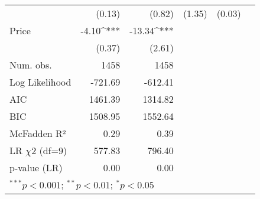 \begin{table}[h]
\begin{center}
\begin{tabular}{l D{.}{.}{4.5} D{.}{.}{4.5} D{.}{.}{2.5} D{.}{.}{2.5} D{.}{.}{3.2}}
                                   & (0.13)      & (0.82)       & (1.35)      & (0.03)     &        \\
Price                              & -4.10^{***} & -13.34^{***} &             &            &        \\
                                   & (0.37)      & (2.61)       &             &            &        \\
\midrule
Num. obs.                          & 1458        & 1458         &             &            &        \\
Log Likelihood                     & -721.69     & -612.41      &             &            &        \\
AIC                                & 1461.39     & 1314.82      &             &            &        \\
BIC                                & 1508.95     & 1552.64      &             &            &        \\
McFadden R²                        & 0.29        & 0.39         &             &            &        \\
LR $\chi 2$ (df=9)                       & 577.83      & 796.40       &             &            &        \\
p-value (LR)                       & 0.00        & 0.00         &             &            &        \\
\bottomrule
{}
\end{tabular}
\end{center}
\end{table}
